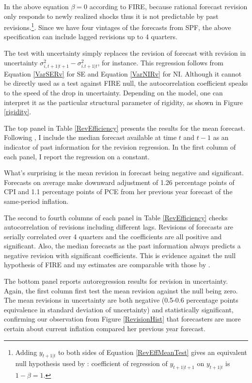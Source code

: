 \documentclass[]{article}
\begin{document}
	In the above equation $\beta =0$ according to FIRE, because rational forecast revision only responds to newly realized shocks thus it is not predictable by past revisions.\footnote{Adding $y_{t+1|t}$ to both sides of Equation \ref{RevEffMeanTest} gives an equivalent null hypothesis used by \citet{fuhrer2018intrinsic}: coefficient of regression of $y_{t+1|t+1}$ on  $y_{t+1|t}$ is $1-\beta=1$. }. Since we have four vintages of the forecasts from SPF, the above specification can include lagged revisions up to 4 quarters.  
	
	The test with uncertainty simply replaces the revision of forecast with revision in uncertainty $\sigma^2_{i,t+1|t+1} - \sigma^2_{i.t+1|t}$, for instance. This regression follows from Equation \ref{VarSERv} for SE and Equation \ref{VarNIRv} for NI. Although it  cannot be directly used as a test against FIRE null, the autocorrelation coefficient speaks to the speed of the drop in uncertainty. Depending on the model, one can interpret it as the particular structural parameter of rigidity, as shown in Figure \ref{rigidity}. 
	
	The top panel in Table \ref{RevEfficiency} presents the results for the mean forecast. Following \citet{fuhrer2018intrinsic}, I include the median forecast available at time $t$ and $t-1$ as an indicator of past information for the revision regression. In the first column of each panel, I report the regression on a constant. 
	
	What's surprising is the mean revision in forecast being negative and significant. Forecasts on average make downward adjustment of 1.26 percentage points of CPI and  1.1 percentage points of PCE from her previous year forecast of the same-period inflation. 
	
	The second to fourth columns of each panel in Table \ref{RevEfficiency} checks autocorrelation of revisions including different lags. Revisions of forecasts are serially correlated over 4 quarters and the coefficients are all positive and significant. Also, the median forecasts as the past information always predicts a negative revision with significant coefficients. This is evidence against the null hypothesis of FIRE and my estimates are comparable with those by \citet{fuhrer2018intrinsic}. 
	
	The bottom panel reports autoregression results for revision in uncertainty. Again, the first column first test the mean revision against the null being zero. The mean revisions in uncertainty are both negative (0.5-0.6 percentage points equivalence in standard deviation of uncertainty) and statistically significant, confirming our observation from Figure \ref{RevisionHist} that forecasters are more certain about current inflation compared her previous year forecast. 
	
\end{document}
